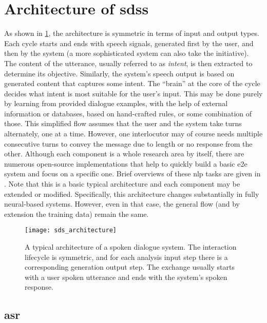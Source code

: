 \section{Architecture of \aclp{sds}}
\label{sec:architecture_sds}

As shown in \cref{fig:sds_architecture}, the architecture is symmetric in terms of input and output types.
Each cycle starts and ends with speech signals, generated first by the user, and then by the system (a more sophisticated system can also take the initiative).
The content of the utterance, usually referred to as \emph{intent}, is then extracted to determine its objective.
Similarly, the system's speech output is based on generated content that captures some intent.
The \enquote{brain} at the core of the cycle decides what intent is most suitable for the user's input.
This may be done purely by learning from provided dialogue examples, with the help of external information or databases, based on hand-crafted rules, or some combination of those.
This simplified flow assumes that the user and the system take turns alternately, one at a time.
However, one interlocutor may of course needs multiple consecutive turns to convey the message due to length or no response from the other.
Although each component is a whole research area by itself, there are numerous open-source implementations that help to quickly build a basic \ac{e2e} system and focus on a specific one.
Brief overviews of these \ac{nlp} tasks are given in .
Note that this is a basic typical architecture and each component may be extended or modified.
Specifically, this architecture changes substantially in fully neural-based systems.
However, even in that case, the general flow (and by extension the training data) remain the same.
%
\begin{figure}[t]
	\centering
	\texttt{[image: sds\_architecture]}
	\caption[Architecture of a spoken dialogue system]
	{A typical architecture of a spoken dialogue system.
	The interaction lifecycle is symmetric, and for each analysis input step there is a corresponding generation output step.
	The exchange usually starts with a user spoken utterance and ends with the system's spoken response.}
	\label{fig:sds_architecture}
\end{figure}

\subsection{\Acl{asr}}
\label{subsec:automatic_speech_recognition}


